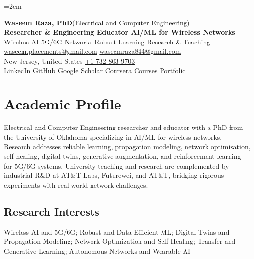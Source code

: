 \documentclass[9pt,letterpaper]{extarticle}
\begin{document}
\emergencystretch=2em
\begin{center}
{\LARGE\bfseries Waseem Raza, PhD}{\normalsize\mdseries \enspace (Electrical and Computer Engineering)}\\[2pt]
{\large\bfseries Researcher \& Engineering Educator \textbar{} AI/ML for Wireless Networks}\\[1pt]
{\small Wireless AI \textbar{} 5G/6G Networks \textbar{} Robust Learning \textbar{} Research \& Teaching}\\[3pt]
{\footnotesize {}\enspace \href{mailto:waseem.placements@gmail.com}{waseem.placements@gmail.com} \textbar{} \href{mailto:waseemraza844@gmail.com}{waseemraza844@gmail.com}\\[1pt]New Jersey, United States \quad {}\enspace \href{tel:+17328039703}{+1 732-803-9703}\\[1pt]\href{https://www.linkedin.com/in/waseem-raza-phd-9a737858/}{LinkedIn} \textbar{} \href{https://github.com/WaseemRaza844}{GitHub} \textbar{} \href{https://scholar.google.com/citations?user=d58Drr0AAAAJ\&hl=en}{Google Scholar} \textbar{} \href{https://waseemraza844.github.io/portfolio/learning.html}{Coursera Courses} \textbar{} \href{https://waseemraza844.github.io/portfolio/}{Portfolio}}
\end{center}
\vspace{-5pt}
\section{Academic Profile}
Electrical and Computer Engineering researcher and educator with a PhD from the University of Oklahoma specializing in AI/ML for wireless networks. Research addresses reliable learning, propagation modeling, network optimization, self-healing, digital twins, generative augmentation, and reinforcement learning for 5G/6G systems. University teaching and research are complemented by industrial R\&D at AT\&T Labs, Futurewei, and AT\&T, bridging rigorous experiments with real-world network challenges.
\subsection{Research Interests}
Wireless AI and 5G/6G; Robust and Data-Efficient ML; Digital Twins and Propagation Modeling; Network Optimization and Self-Healing; Transfer and Generative Learning; Autonomous Networks and Wearable AI\par
{}
\end{document}
